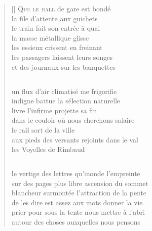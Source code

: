 \documentclass[a4paper, titlepage, twoside, 12pt]{book}
\begin{document}
\vspace*{2cm}
\settowidth{\versewidth}{aux pieds des versants rejoints dans le val}
\begin{verse}[\versewidth]
{\lettrine[lines=1]{\textcolor[gray]{0.6}{Q}}{\space ue le hall}} de gare est bondé\\
la file d'attente aux guichets\\
le train fait son entrée à quai\\
la masse métallique glisse\\
les essieux crissent en freinant\\
les passagers laissent leurs songes\\
et des journaux sur les banquettes\\
\subsection*{}
un flux d'air climatisé me frigorifie\\
indigne battue la sélection naturelle\\
livre l'infirme projette sa fin\\
dans le couloir où nous cherchons salaire\\
le rail sort de la ville\\
aux pieds des versants rejoints dans le val\\
les Voyelles de Rimbaud\\
\subsection*{}
le vertige des lettres qu'inonde l'empreinte\\
sur des pages plus libre ascension du sommet\\
blancheur surmontée l'attraction de la pente\\
de les dire est assez aux mots donner la vie\\
prier pour sous la tente nous mettre à l'abri\\
autour des choses auxquelles nous pensons\\
\end{verse}

\newpage
\end{document}
